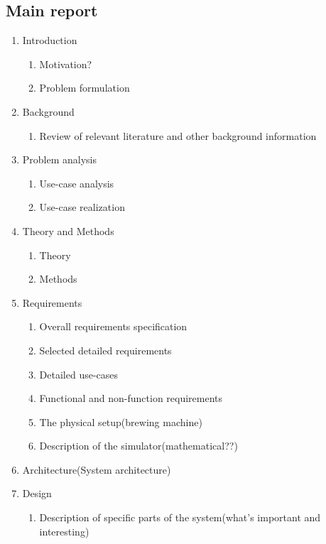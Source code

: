 \subsection{Main report}
\begin{enumerate}
    \item Introduction  
        \begin{enumerate}
            \item Motivation?  
            \item Problem formulation  
        \end{enumerate}
    \item Background  
        \begin{enumerate}
            \item Review of relevant literature and other background information
        \end{enumerate}
    \item Problem analysis  
        \begin{enumerate}
            \item Use-case analysis  
            \item Use-case realization  
        \end{enumerate}
    \item Theory and Methods  
        \begin{enumerate}
            \item Theory  
            \item Methods  
        \end{enumerate}
    \item Requirements  
        \begin{enumerate}
            \item Overall requirements specification  
            \item Selected detailed requirements  
            \item Detailed use-cases  
            \item Functional and non-function requirements
            \item The physical setup(brewing machine)
            \item Description of the simulator(mathematical??)
        \end{enumerate}
    \item Architecture(System architecture)
    \item Design
        \begin{enumerate}
            \item Description of specific parts of the system(what’s important and interesting)

\end{enumerate}
\end{enumerate}
